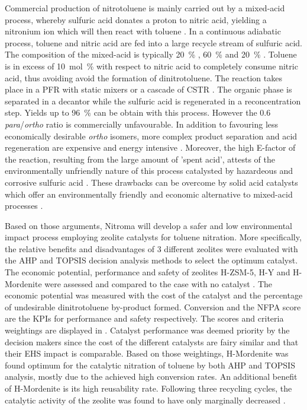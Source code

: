 Commercial production of nitrotoluene is mainly carried out by a mixed-acid process, whereby sulfuric acid donates a proton to nitric acid, yielding a nitronium ion which will then react with toluene \cite{halder_nitration_2007}. In a continuous adiabatic process, toluene and nitric acid are fed into a large recycle stream of sulfuric acid. The composition of the mixed-acid is typically \SI{20}{\percent} , \SI{60}{\percent}  and \SI{20}{\percent}  \cite{pande_nitration_2010}. Toluene is in excess of \SI{10}{mol\percent} with respect to nitric acid to completely consume nitric acid, thus avoiding avoid the formation of dinitrotoluene. The reaction takes place in a PFR with static mixers or a cascade of CSTR \cite{dugal_nitrobenzene_2005}. The organic phase is separated in a decantor while the sulfuric acid is regenerated in a reconcentration step. Yields up to \SI{96}{\percent} can be obtain with this process. However the 0.6 \textit{para}/\textit{ortho} ratio is commercially unfavourable. In addition to favouring less economically desirable \textit{ortho} isomers, more complex product separation and acid regeneration are expensive and energy intensive \cite{sreedhar_scientific_2013}. Moreover, the high E-factor of the reaction, resulting from the large amount of 'spent acid', attests of the environmentally unfriendly nature of this process catalysted by hazardeous and corrosive sulfuric acid \cite{pande_nitration_2010}. These drawbacks can be overcome by solid acid catalysts which offer an environmentally friendly and economic alternative to mixed-acid processes \cite{vassena_selective_1999}.

 Based on those arguments, Nitroma will develop a safer and low environmental impact process employing zeolite catalysts for toluene nitration. More specifically, the relative benefits and disadvantages of 3 different zeolites were evaluated with the AHP and TOPSIS decision analysis methods to select the optimum catalyst. The economic potential, performance and safety of zeolites H-ZSM-5, H-Y and H-Mordenite were assessed and compared to the case with no catalyst \cite{jeeru_kinetics_2018}.  The economic potential was measured with the cost of the catalyst and the percentage of undesirable dinitrotoluene by-product formed. Conversion and the NFPA score are the KPIs for performance and safety respectively. The scores and criteria weightings are displayed in . Catalyst performance was deemed priority by the decision makers since the cost of the different catalysts are fairy similar and that their EHS impact is comparable. Based on those weightings, H-Mordenite was found optimum for the catalytic nitration of toluene by both AHP and TOPSIS analysis, mostly due to the achieved high conversion rates. An additional benefit of H-Mordenite is its high reusability rate. Following three recycling cycles, the catalytic activity of the zeolite was found to have only marginally decreased \cite{jeeru_kinetics_2018}. 


